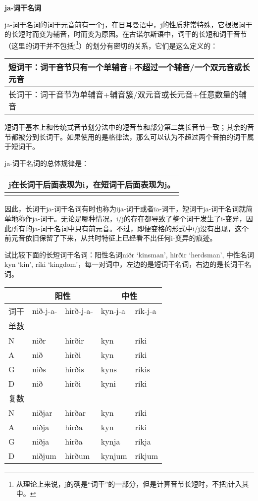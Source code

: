 \textbf{ja-词干名词}

ja-词干名词的词干元音前有一个j，在日耳曼语中，j的性质非常特殊，它根据词干的长短时而变为辅音，时而变为原因。在古诺尔斯语中，词干的长短和词干音节（这里的词干并不包括j\footnote{从理论上来说，j的确是``词干''的一部分，但是计算音节长短时，不把j计入其中。}）的划分有密切的关系，它们是这么定义的：

\begin{longtable}{l}
\toprule
短词干：词干音节只有一个单辅音+不超过一个辅音/一个双元音或长元音 \\
\midrule
\endhead
\bottomrule
\endfoot
长词干：词干音节为单辅音+辅音簇/双元音或长元音+任意数量的辅音 \\
\end{longtable}

短词干基本上和传统式音节划分法中的短音节和部分第二类长音节一致；其余的音节都被分到长词干。如果使用的是格律法，那么可以认为不超过两个音拍的词干属于短词干。

ja-词干名词的总体规律是：

\begin{longtable}{l}
\toprule
j在长词干后面表现为i，在短词干后面表现为j。 \\
\midrule
\endhead
\bottomrule
\endfoot
\end{longtable}

因此，长词干ja-词干名词有时也称为ija-词干或者īa-词干，短词干ja-词干名词就简单地称作ja-词干。无论是哪种情况，i/j的存在都导致了整个词干发生了i-变异，因此所有的ja-词干名词中只有前元音。不过，即便变格的形式中i/j没有出现，这个前元音依旧保留了下来，从共时特征上已经看不出任何i-变异的痕迹。

试比较下面的长短词干名词：阳性名词niðr `kinsman', hirðir `herdsman',
中性名词kyn `kin', ríki
`kingdom'，每一对词中，左边的是短词干名词，右边的是长词干名词。

\begin{longtable}{lllll}
\toprule
 &\multicolumn{2}{c}{阳性} &\multicolumn{2}{c}{中性} \\
\midrule
\endhead
\bottomrule
\endfoot
词干 & nið-j-a- & hirð-j-a- & kyn-j-a & rík-j-a \\
单数 & & & & \\
N & niðr & hirðir & kyn & ríki \\
A & nið & hirði & kyn & ríki \\
G & niðs & hirðis & kyns & ríkis \\
D & nið & hirði & kyni & ríki \\
复数 & & & & \\
N & niðjar & hirðar & kyn & ríki \\
A & niðja & hirða & kyn & ríki \\
G & niðja & hirða & kynja & ríkja \\
D & niðjum & hirðum & kynjum & ríkjum \\
\end{longtable}

